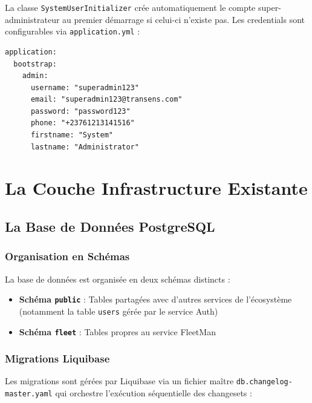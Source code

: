 \documentclass[12pt,a4paper]{report}
\begin{document}
La classe \texttt{SystemUserInitializer} crée automatiquement le compte super-administrateur au premier démarrage si celui-ci n'existe pas. Les credentials sont configurables via \texttt{application.yml} :

\begin{lstlisting}[style=yamlStyle, caption={Configuration du super-administrateur initial}]
application:
  bootstrap:
    admin:
      username: "superadmin123"
      email: "superadmin123@transens.com"
      password: "password123"
      phone: "+23761213141516"
      firstname: "System"
      lastname: "Administrator"
\end{lstlisting}

\chapter{La Couche Infrastructure Existante}

\section{La Base de Données PostgreSQL}

\subsection{Organisation en Schémas}

La base de données est organisée en deux schémas distincts :

\begin{itemize}[leftmargin=2cm]
  \item \textbf{Schéma \texttt{public}} : Tables partagées avec d'autres services de l'écosystème (notamment la table \texttt{users} gérée par le service Auth)
  \item \textbf{Schéma \texttt{fleet}} : Tables propres au service FleetMan
\end{itemize}

\subsection{Migrations Liquibase}

Les migrations sont gérées par Liquibase via un fichier maître \texttt{db.changelog-master.yaml} qui orchestre l'exécution séquentielle des changesets :
\end{document}
